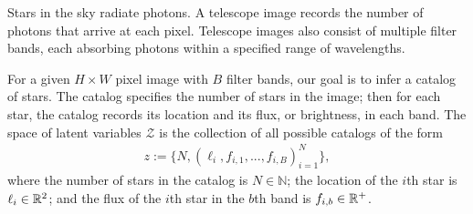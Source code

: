 Stars in the sky radiate photons. A telescope image records the number of photons that arrive at each pixel. Telescope images also consist of multiple filter bands, each absorbing photons within a specified range of wavelengths. 

For a given $H \times W$ pixel image with $B$ filter bands, our goal is to infer a catalog of 
stars. 
The catalog specifies the number of stars 
in the image; then for each star, the catalog 
records its location and its flux, or brightness,
in each band. 
The space of latent variables 
$\mathcal{Z}$ is the collection of all possible catalogs of the form
\begin{align}
    z := \{N, (\ell_i, f_{i,1}, ..., f_{i,B})_{i = 1}^N\},
    \label{eq:cat_formulation}
\end{align}
where the number of stars in the catalog
is $N\in\mathbb{N}$;
the location of the $i$th star is $\ell_i \in \mathbb{R}^2$; and 
the flux of the $i$th star in the $b$th band is $f_{i, b}\in\mathbb{R}^+$. 

